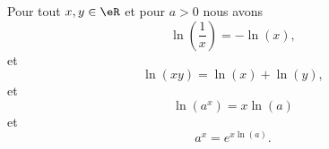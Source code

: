 \begin{proposition}      \label{PROPooLAOWooEYvXmI}
    Pour tout \( x,y\in \eR\) et pour \( a>0\) nous avons
    \begin{equation}
        \ln(\frac{1}{ x })=-\ln(x),
    \end{equation}
    et
    \begin{equation}        \label{EQooJVMUooVpUKyo}
        \ln(xy)=\ln(x)+\ln(y),
    \end{equation}
    et
    \begin{equation}        \label{EQooEJQSooWCczXy}
        \ln(a^x)=x\ln(a)
    \end{equation}
    et
    \begin{equation}
        a^x= e^{x\ln(a)}.
    \end{equation}
\end{proposition}

